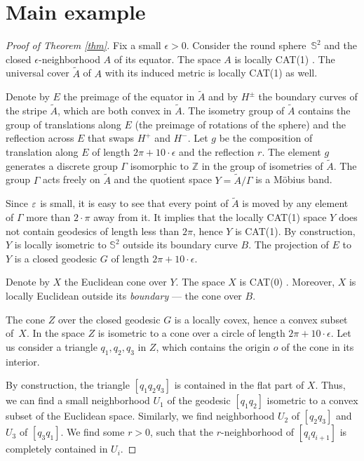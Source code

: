 \documentclass[a4paper,10pt]{article}
\begin{document}
\section{Main example}

\begin{proof}[Proof of Theorem \ref{thm}]
Fix a small $\epsilon >0$.
Consider the round sphere~$\mathbb{S}^2$ and the closed 
$\epsilon$-neighborhood $A$  of its equator.
The space $A$ is locally CAT(1) \cite{LWcurv}.
The universal cover $\tilde A$ of $A$ with its induced metric is locally CAT(1) as well. 

Denote by $E$ the preimage of the equator in $\tilde A$  and by $H^{\pm}$ the boundary curves of the stripe $\tilde A$, which are both convex in $\tilde A$.
The isometry group of $\tilde A$ 
contains the group of translations  along $E$ (the preimage of rotations of the sphere) and 
the reflection across $E$ that swaps $H^+$ and $H^-$.
Let $g$   be the composition of translation along $E$  of length $2\pi +10\cdot\epsilon$  and the reflection $r$.
The element $g$ generates a discrete group $\Gamma$ isomorphic to $\mathbb Z$ in the group of isometries  of $\tilde A$.
The group $\Gamma$ acts freely on $\tilde A$ and the quotient space $Y =\tilde A/\Gamma$ is a Möbius band.

Since $\varepsilon$ is small, it is easy to see that every point of $\tilde A$ is moved by any element of $\Gamma$ more than $2\cdot\pi$ away from it.
It implies that the locally CAT(1) space $Y$ does not  contain geodesics of length less than $2\pi$, hence $Y$ is CAT(1).
By construction, $Y$ is locally isometric to $\mathbb{S}^2$ outside its boundary curve $B$.
The projection of $E$ to $Y$ is a closed geodesic $G$ of length $2\pi +10\cdot\epsilon$.

Denote by $X$ the Euclidean cone over $Y$.
The space $X$ is CAT(0)  \cite{BBI}.
Moreover, $X$ is locally Euclidean outside its \emph{boundary} --- the cone over $B$.

The cone $Z$ over the closed geodesic $G$ is a locally covex, hence a convex subset of~$X$.
In the space $Z$ is isometric to a cone over a circle of length $2\pi +10\cdot\epsilon$.
Let us consider a triangle
$q_1,q_2,q_3$ 
in $Z$, which contains the origin $o$ of the cone in its interior.

By construction, the triangle $[q_1q_2q_3]$ is contained in the flat part of $X$.
Thus, we can find a small neighborhood $U_1$ of the geodesic $[q_1q_2]$ isometric to a convex subset of the Euclidean space.
Similarly, we find neighborhood $U_2$ of $[q_2q_3]$ and $U_3$ of $[q_3q_1]$.
We find some $r>0$, such that the $r$-neighborhood of $[q_iq_{i+1}]$ is completely contained in $U_i$.


\end{proof}
\end{document}
